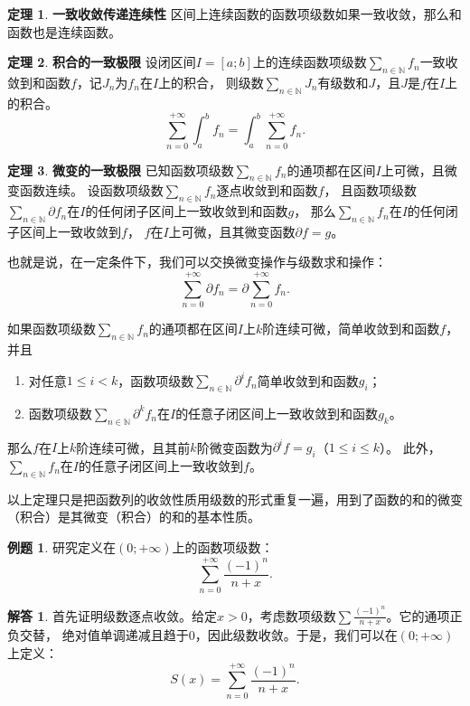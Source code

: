 \documentclass[12pt,UTF8]{ctexbook}
\theoremstyle{definition}
\newtheorem{tm}{定理}[section]
\newtheorem{et}{例题}[section]
\newtheorem*{so}{解答}
\theoremstyle{plain}
\begin{document}
\begin{appendix}
\begin{tm}{\textbf{一致收敛传递连续性}}
    区间上连续函数的函数项级数如果一致收敛，那么和函数也是连续函数。
\end{tm}

\begin{tm}{\textbf{积合的一致极限}}
    设闭区间$I=[a;b]$上的连续函数项级数$\sum_{n\in\mathbb{N}} f_n$一致收敛到和函数$f$，记$J_n$为$f_n$在$I$上的积合，
    则级数$\sum_{n\in\mathbb{N}} J_n$有级数和$J$，且$J$是$f$在$I$上的积合。
    $$ \sum_{n=0}^{+\infty} \int_a^b f_n = \int_a^b \sum_{n=0}^{+\infty} f_n. $$
\end{tm}

\begin{tm}{\textbf{微变的一致极限}}
    已知函数项级数$\sum_{n\in\mathbb{N}} f_n$的通项都在区间$I$上可微，且微变函数连续。
    设函数项级数$\sum_{n\in\mathbb{N}} f_n$逐点收敛到和函数$f$，
    且函数项级数$\sum_{n\in\mathbb{N}} \partial f_n$在$I$的任何闭子区间上一致收敛到和函数$g$，
    那么$\sum_{n\in\mathbb{N}} f_n$在$I$的任何闭子区间上一致收敛到$f$，
    $f$在$I$上可微，且其微变函数$\partial f = g$。

    也就是说，在一定条件下，我们可以交换微变操作与级数求和操作：
    $$ \sum_{n=0}^{+\infty} \partial f_n = \partial \sum_{n=0}^{+\infty} f_n. $$
    
    如果函数项级数$\sum_{n\in\mathbb{N}} f_n$的通项都在区间$I$上$k$阶连续可微，简单收敛到和函数$f$，并且
    \begin{enumerate}
        \item 对任意$1 \leqslant i < k$，函数项级数$\sum_{n\in\mathbb{N}} \partial^i f_n$简单收敛到和函数$g_i$；
        \item 函数项级数$\sum_{n\in\mathbb{N}} \partial^k f_n$在$I$的任意子闭区间上一致收敛到和函数$g_k$。
    \end{enumerate}
    那么$f$在$I$上$k$阶连续可微，且其前$k$阶微变函数为$\partial^i f = g_i$（$1 \leqslant i\leqslant k$）。
    此外，$\sum_{n\in\mathbb{N}} f_n$在$I$的任意子闭区间上一致收敛到$f$。
\end{tm}

以上定理只是把函数列的收敛性质用级数的形式重复一遍，用到了函数的和的微变（积合）是其微变（积合）的和的基本性质。

\begin{et}
    研究定义在$(0;+\infty)$上的函数项级数：
    $$\sum_{n=0}^{+\infty} \frac{(-1)^n}{n + x}.$$
\end{et}

\begin{so}
    首先证明级数逐点收敛。给定$x>0$，考虑数项级数$\sum \frac{(-1)^n}{n + x}$。它的通项正负交替，
    绝对值单调递减且趋于$0$，因此级数收敛。于是，我们可以在$(0;+\infty)$上定义：
    $$ S(x) = \sum_{n=0}^{+\infty} \frac{(-1)^n}{n + x}. $$


\end{so}
\end{appendix}
\end{document}
